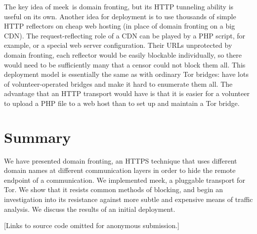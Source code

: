 \documentclass[conference]{IEEEtran}
\newcommand{\meekserver}{\mbox{meek-server}\xspace}
\newcommand{\meek}{meek\xspace}
\begin{document}

The key idea of \meek\ is domain fronting,
but its HTTP tunneling ability is useful on its own.
Another idea for deployment is to use
thousands of simple HTTP reflectors on cheap web hosting
(in place of domain fronting on a big CDN).
The request-reflecting role of a CDN can
be played by a PHP script, for example,
or a special web server configuration.
Their URLs unprotected by domain fronting,
each reflector would be easily blockable individually,
so there would need to be sufficiently many that
a censor could not block them all.
This deployment model is essentially the same as with
ordinary Tor bridges: have lots of volunteer-operated bridges
and make it hard to enumerate them all.
The advantage that an HTTP transport would have
is that it is easier for a volunteer to upload a PHP file to a web host
than to set up and maintain a Tor bridge.

\section{Summary}
\label{sec:summary}

We have presented domain fronting,
an HTTPS technique that uses different domain names
at different communication layers in
order to hide the remote endpoint of a communication.
We implemented \meek,
a pluggable transport for Tor.
We show that it resists common methods of blocking,
and begin an investigation into its
resistance against more subtle and expensive means of traffic analysis.
We discuss the results of an initial deployment.

[Links to source code omitted for anonymous submission.]


\end{document}
